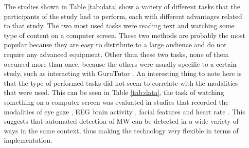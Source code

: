 The studies shown in Table \ref{tab:data} show a variety of different tasks that the participants of the study had to perform, each with different advantages related to that study. The two most used tasks were reading text and watching some type of content on a computer screen. These two methods are probably the most popular because they are easy to distribute to a large audience and do not require any advanced equipment. Other than these two tasks, none of them occurred more than once, because the others were usually specific to a certain study, such as interacting with GuruTutor \cite{Hutt2017OutClassroom}. An interesting thing to note here is that the type of performed tasks did not seem to correlate with the modalities that were used. This can be seen in Table \ref{tab:data}, the task of watching something on a computer screen was evaluated in studies that recorded the modalities of eye gaze \cite{Zhao2017ScalableApproach}, EEG brain activity \cite{Russell2016MonitoringEnvironments}, facial features \cite{Stewart2017FaceComprehension} and heart rate \cite{Pham2015Attentivelearner:Tracking}. This suggests that automated detection of MW can be detected in a wide variety of ways in the same context, thus making the technology very flexible in terms of implementation.